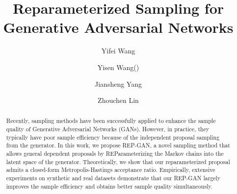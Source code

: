 \documentclass[runningheads]{llncs}
\newcommand{\<}{\left\langle}
\renewcommand{\>}{\right\rangle}
\begin{document}
\title{Reparameterized Sampling for Generative Adversarial Networks}


%
\author{Yifei Wang
\and
Yisen Wang(\Letter)
\and
Jiansheng Yang
\and
Zhouchen Lin
}
%




\maketitle

\begin{abstract}
Recently, sampling methods have been successfully applied to enhance the sample quality of Generative Adversarial Networks (GANs). However, in practice, they typically have poor sample efficiency because of the independent proposal sampling from the generator. 
In this work, we propose REP-GAN, a novel sampling method that allows general dependent proposals by REParameterizing the Markov chains
into the latent space of the generator.
Theoretically, we show that our reparameterized proposal admits a closed-form Metropolis-Hastings acceptance ratio.
Empirically, extensive experiments on synthetic and real datasets demonstrate that our REP-GAN largely improves the sample efficiency and obtains better sample quality simultaneously.
\end{abstract}
\end{document}
